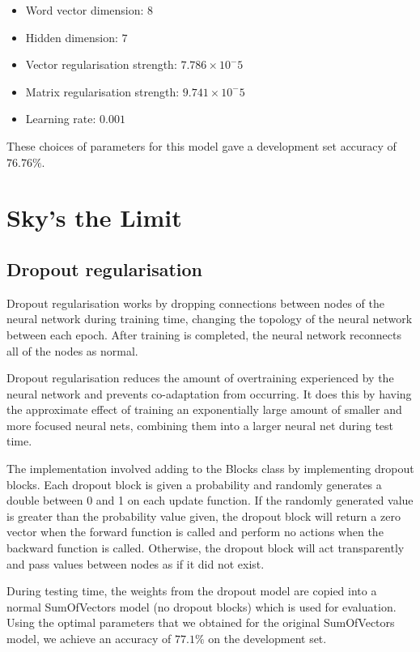 \documentclass{article} %
\begin{document}
\begin{itemize}

\item Word vector dimension: $8$
\item Hidden dimension: $7$
\item Vector regularisation strength: $7.786 \times 10^-5$
\item Matrix regularisation strength: $9.741 \times 10^-5$
\item Learning rate: $0.001$

\end{itemize}

These choices of parameters for this model gave a development set accuracy of $76.76\%$.

\section{Sky's the Limit}

\subsection{Dropout regularisation}

Dropout regularisation works by dropping connections between nodes of the neural network during training time, changing the topology of the neural network between each epoch. After training is completed, the neural network reconnects all of the nodes as normal.

Dropout regularisation reduces the amount of overtraining experienced by the neural network and prevents co-adaptation  from occurring. It does this by having the approximate effect of training an exponentially large amount of smaller and more focused neural nets, combining them into a larger neural net during test time.

The implementation involved adding to the Blocks class by implementing dropout blocks. Each dropout block is given a probability and randomly generates a double between 0 and 1 on each update function. If the randomly generated value is greater than the probability value given, the dropout block will return a zero vector when the forward function is called and perform no actions when the backward function is called. Otherwise, the dropout block will act transparently and pass values between nodes as if it did not exist.

During testing time, the weights from the dropout model are copied into a normal SumOfVectors model (no dropout blocks) which is used for evaluation. Using the optimal parameters that we obtained for the original SumOfVectors model, we achieve an accuracy of $77.1\%$ on the development set.
\end{document}
